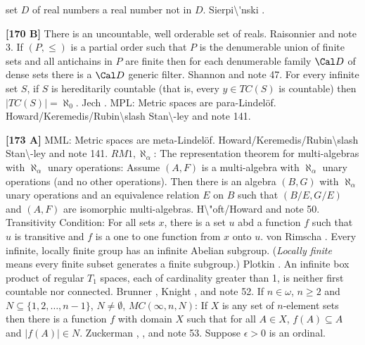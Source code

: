 set $D$ of real numbers a real number not in $D$.  \ac{Sierpi\'nski}
\cite{1954}.
\smallskip
\item{}{\bf [170 B]}  There is an uncountable, well orderable set of
reals.  \ac{Raisonnier} \cite{1982} and note 3.
\medskip
{} If $(P,\le)$ is a partial order such that $P$ is
the denumerable union of finite sets and all antichains in $P$ are finite
then for each denumerable family ${\Cal D}$ of dense sets there is a
${\Cal D}$ generic filter.  \ac{Shannon} \cite{1990} and note 47.
\medskip
{} For every infinite set $S$, if $S$ is hereditarily
countable  (that is, every $y\in TC(S)$ is countable) then $|TC(S)|=
\aleph_{0}$. \ac{Jech} \cite{1982}.
\medskip
{}  MPL: Metric spaces are para-Lindel\"of.
\ac{Howard/Keremedis/Rubin\slash Stan\-ley} \cite{1999} and note 141.
\smallskip
\item{}{\bf [173 A]}  MML: Metric spaces are meta-Lindel\"of.
\ac{Howard/Keremedis/Rubin\slash Stan\-ley} \cite{1999} and note 141.
\medskip
{} $RM1,\aleph_{\alpha }$: The
representation theorem for multi-algebras with $\aleph_{\alpha }$
unary operations:  Assume $(A,F)$ is  a  multi-algebra  with
$\aleph_{\alpha }$ unary operations (and no other operations).
Then  there  is  an  algebra $(B,G)$  with $\aleph_{\alpha }$
unary operations and an equivalence relation $E$ on $B$ such that
$(B/E,G/E)$ and $(A,F)$ are isomorphic multi-algebras.
\ac{H\"oft/Howard} \cite{1981} and note 50.
\medskip
{} Transitivity Condition: For all sets $x$, there is
a set $u$ abd a function $f$ such that $u$ is transitive and $f$ is a one
to one function from $x$ onto $u$.  von \ac{Rimscha} \cite{1982}.
\medskip
{} Every infinite, locally finite group has an
infinite Abelian subgroup. ({\it Locally finite} means every finite subset
generates a finite subgroup.)  \ac{Plotkin} \cite{1981}.
\medskip
{}  An infinite box product of regular $T_1$ spaces,
each of cardinality greater than 1, is neither first countable nor
connected.  \ac{Brunner} \cite{1981a}, \ac{Knight} \cite{1964}, and
note 52.
\medskip
{} If  $n\in\omega$, $n\ge 2$ and
$N \subseteq \{ 1, 2, \ldots , n-1 \}$, $N \neq\emptyset$,
$MC(\infty,n, N)$:  If $X$ is any set of $n$-element sets then  there
is  a function $f$ with domain $X$ such that for all $A\in X$,
$f(A)\subseteq A$ and $|f(A)|\in N$. \ac{Zuckerman} \cite{1969a},
\cite{1981}, and note 53.
\medskip
{} Suppose  $\epsilon > 0$ is an ordinal.
